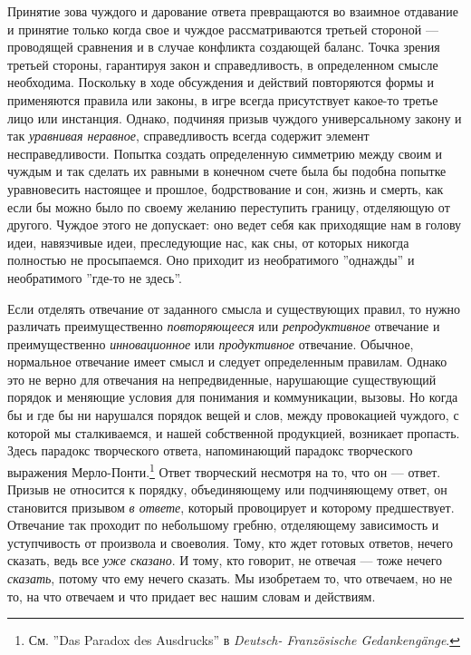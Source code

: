 \documentclass[12pt]{book}
\begin{document}
Принятие зова чуждого и дарование ответа превращаются во взаимное отдавание и принятие только когда свое и чуждое рассматриваются третьей стороной --- проводящей сравнения и в случае конфликта создающей баланс. Точка зрения третьей стороны, гарантируя закон и справедливость, в определенном смысле необходима. Поскольку в ходе обсуждения и действий повторяются формы и применяются правила или законы, в игре всегда присутствует какое-то третье лицо или инстанция. Однако, подчиняя призыв чуждого универсальному закону и так \textit{уравнивая неравное}, справедливость всегда содержит элемент несправедливости. Попытка создать определенную симметрию между своим и чуждым и так сделать их равными в конечном счете была бы подобна попытке уравновесить настоящее и прошлое, бодрствование и сон, жизнь и смерть, как если бы можно было по своему желанию переступить границу, отделяющую от другого. Чуждое этого не допускает: оно ведет себя как приходящие нам в голову идеи, навязчивые идеи, преследующие нас, как сны, от которых никогда полностью не просыпаемся. Оно приходит из необратимого ''однажды'' и необратимого ''где-то не здесь''.

Если отделять отвечание от заданного смысла и существующих правил, то нужно различать преимущественно \textit{повторяющееся} или \textit{репродуктивное} отвечание и преимущественно \textit{инновационное} или \textit{продуктивное} отвечание. Обычное, нормальное отвечание имеет смысл и следует определенным правилам. Однако это не верно для отвечания на непредвиденные, нарушающие существующий порядок и меняющие условия для понимания и коммуникации, вызовы. Но когда бы и где бы ни нарушался порядок вещей и слов, между провокацией чуждого, с которой мы сталкиваемся, и нашей собственной продукцией, возникает пропасть. Здесь парадокс творческого ответа, напоминающий парадокс творческого выражения Мерло-Понти.\footnote{См. ''Das Paradox des Ausdrucks'' в \textit{Deutsch- Französische Gedankengänge}.} Ответ творческий несмотря на то, что он --- ответ. Призыв не относится к порядку, объединяющему или подчиняющему ответ, он становится призывом \textit{в ответе}, который провоцирует и которому предшествует. Отвечание так проходит по небольшому гребню, отделяющему зависимость и уступчивость от произвола и своеволия. Тому, кто ждет готовых ответов, нечего сказать, ведь все \textit{уже сказано}. И тому, кто говорит, не отвечая --- тоже нечего \textit{сказать}, потому что ему нечего сказать. Мы изобретаем то, что отвечаем, но не то, на что отвечаем и что придает вес нашим словам и действиям.
\end{document}
